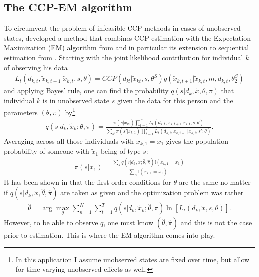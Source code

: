 \subsection{The CCP-EM algorithm}
To circumvent the problem of infeasible CCP methods in cases of unobserved states, \cite{ArcidiaconoMiller2011} developed a method that combines CCP estimation with the Expectation Maximization (EM) algorithm from \cite{Dempsteretal1977} and in particular its extension to sequential estimation from \cite{ArcidiaconoJones2003}. Starting with the joint likelihood contribution for individual $k$ of observing his data
\begin{align}
L_t(d_{k,t},\tilde{x}_{k,t+1}|\tilde{x}_{k,t},s,\theta)=CCP(d_{kt}|\tilde{x}_{kt},s,\theta^S)g(\tilde{x}_{k,t+1}|\tilde{x}_{k,t},m,d_{k,t},\theta_2^S)
\end{align}
and applying Bayes' rule, one can find the probability $q(s|d_{k},\tilde{x},\theta,\pi)$ that individual $k$ is in unobserved state $s$ given the data for this person and the parameters $(\theta,\pi)$ by\footnote{In this application I assume unobserved states are fixed over time, but \cite{ArcidiaconoMiller2011} allow for time-varying unobserved effects as well.}
\begin{align}
q(s|d_k,\tilde{x}_k;\theta,\pi)=\frac{\pi(s|\tilde{x}_{k1})\prod_{t=1}^T{L_t(d_{k,t},\tilde{x}_{k,t+1}|\tilde{x}_{k,t},s;\theta)} }{\sum_{s'}\pi(s'|\tilde{x}_{k,1})\prod_{t=1}^T{L_t(d_{k,t},\tilde{x}_{k,t+1}|\tilde{x}_{k,t},s';\theta)}}.
\end{align}
Averaging across all those individuals with $\tilde{x}_{k,1}=\tilde{x}_1$ gives the population probability of someone with $\tilde{x}_1$ being of type $s$:
\begin{align}
\hat{\pi}(s|x_1)=\frac{\sum_k{q(s|d_k,\tilde{x};\hat{\theta},\hat{\pi})\mathbb{I}{(\tilde{x}_{k,1}=\tilde{x}_1)}}}{\sum_{n}{\mathbb{I}{(\tilde{x}_{k,1}=x_1)}}}
\end{align}
It has been shown in \cite{Dempsteretal1977} that the first order conditions for $\theta$ are the same no matter if $q(s|d_k,\tilde{x},\hat{\theta},\hat{\pi})$ are taken as given and the optimization problem was rather
\begin{align}
\hat{\theta}=\arg\max_{\theta}{\sum_{n=1}^N{\sum_{t=1}^T{q(s|d_k,\tilde{x}_k;\hat{\theta},\hat{\pi})\ln[L_t(d_k,\tilde{x},s,\theta)]}}}.
\end{align}
However, to be able to observe $q$, one must know $(\hat{\theta},\hat{\pi})$ and this is not the case prior to estimation. This is where the EM algorithm comes into play. 

